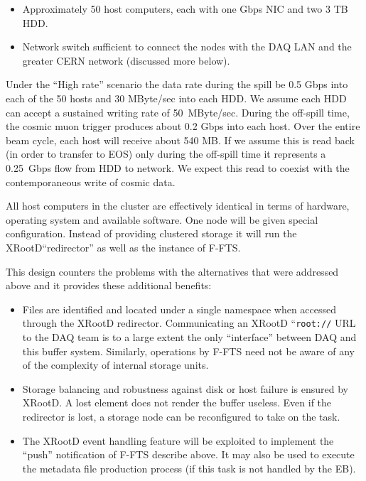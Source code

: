 \documentclass[pdftex,12pt,letter]{article}
\newcommand{\xrd}{XRootD\xspace}
\begin{document}
\begin{itemize}
\item Approximately 50 host computers, each with one Gbps NIC and two 3 TB HDD.
\item Network switch sufficient to connect the nodes with the DAQ LAN
  and the greater CERN network (discussed more below).
\end{itemize}

\noindent Under the ``High rate'' scenario the data rate during the
spill be 0.5 Gbps into each of the 50 hosts and 30 MByte/sec into each
HDD.  We assume each HDD can accept a sustained writing rate of
50~MByte/sec.  During the off-spill time, the cosmic muon trigger
produces about 0.2 Gbps into each host.  Over the entire beam cycle,
each host will receive about 540 MB.  If we assume this is read back
(in order to transfer to EOS) only during the off-spill time it
represents a 0.25~Gbps flow from HDD to network.  We expect this read
to coexist with the contemporaneous write of cosmic data.

All host computers in the cluster are effectively identical in terms
of hardware, operating system and available software.  One node will
be given special configuration.  Instead of providing clustered
storage it will run the \xrd ``redirector'' as well as the instance of
F-FTS.

This design counters the problems with the alternatives that were
addressed above and it provides these additional benefits:

\begin{itemize}
\item Files are identified and located under a single namespace when
  accessed through the \xrd redirector.  Communicating an \xrd
  ``\texttt{root://} URL to the DAQ team is to a large extent the only
  ``interface'' between DAQ and this buffer system.  Similarly,
  operations by F-FTS need not be aware of any of the complexity of
  internal storage units.
\item Storage balancing and robustness against disk or host failure is
  ensured by \xrd.  A lost element does not render the buffer useless.
  Even if the redirector is lost, a storage node can be reconfigured
  to take on the task.
\item The \xrd event handling feature will be exploited to implement
  the ``push'' notification of F-FTS describe above.  It may also be
  used to execute the metadata file production process (if this task
  is not handled by the EB).
\end{itemize}
\end{document}
